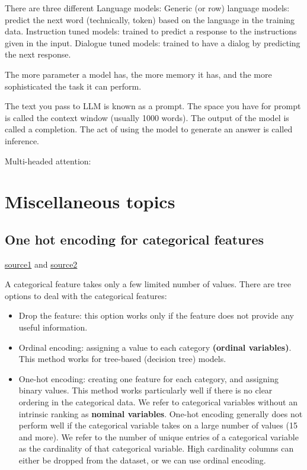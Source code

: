 \documentclass[12pt]{report}
\begin{document}
There are three different Language models: Generic (or row) language models: predict the next word (technically, token) based on the language in the training data. Instruction tuned models: trained to predict a response to the instructions given in the input. Dialogue tuned models: trained to have a dialog by predicting the next response.


The more parameter a model has, the more memory it has, and the more sophisticated the task it can perform.

The text you pass to LLM is known as a prompt. The space you have for prompt is called the context window (usually 1000 words). The output of the model is called a completion. The act of using the model to generate an answer is called inference.

Multi-headed attention:


\chapter[Miscellaneous topics]{Miscellaneous topics}

\section{One hot encoding for categorical features}
\label{sec:one-hot}

\href{https://www.youtube.com/watch?v=v_4KWmkwmsU&ab_channel=deeplizard}{source1} and \href{https://machinelearningmastery.com/how-to-one-hot-encode-sequence-data-in-python/}{source2}

A categorical feature takes only a few limited number of values. There are tree options to deal with the categorical features:
\begin{itemize}
  \item Drop the feature: this option works only if the feature does not provide any useful information.
  \item Ordinal encoding: assigning a value to each category \textbf{(ordinal variables)}. This method works for tree-based (decision tree) models.
  \item One-hot encoding: creating one feature for each category, and assigning binary values. This method works particularly well if there is no clear ordering in the categorical data. We refer to categorical variables without an intrinsic ranking as \textbf{nominal variables}. One-hot encoding generally does not perform well if the categorical variable takes on a large number of values (15 and more). We refer to the number of unique entries of a categorical variable as the cardinality of that categorical variable. High cardinality columns can either be dropped from the dataset, or we can use ordinal encoding.
\end{itemize}
\end{document}
